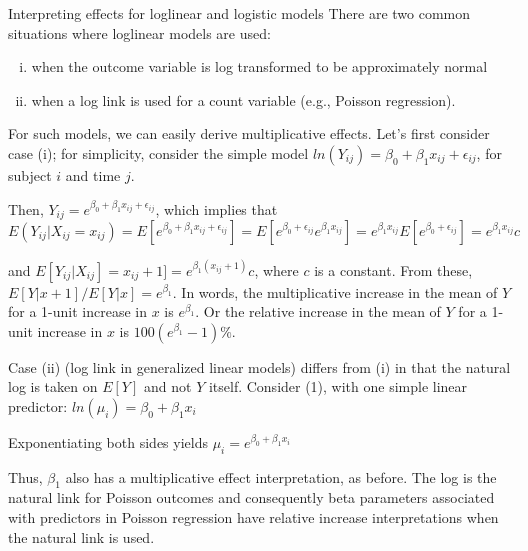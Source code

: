\documentclass[
  9pt,
  ignorenonframetext,
]{beamer}
\providecommand{\tightlist}{%
  \setlength{\itemsep}{0pt}\setlength{\parskip}{0pt}}
\begin{document}
\begin{frame}{Interpreting effects for loglinear and logistic models}
\protect\hypertarget{interpreting-effects-for-loglinear-and-logistic-models}{}
There are two common situations where loglinear models are used:

\begin{enumerate}
[(i)]
\tightlist
\item
  when the outcome variable is log transformed to be approximately
  normal
\item
  when a log link is used for a count variable (e.g., Poisson
  regression).
\end{enumerate}

For such models, we can easily derive multiplicative effects. Let's
first consider case (i); for simplicity, consider the simple model
\(ln(Y_{ij})= \beta_0+ \beta_1 x_{ij} + \epsilon_{ij}\), for subject
\(i\) and time \(j\).

Then, \(Y_{ij} = e^{\beta_0+ \beta_1 x_{ij} + \epsilon_{ij}}\), which
implies that
\(E(Y_{ij} |X_{ij} =x_{ij} )= E[e^{\beta_0+ \beta_1 x_{ij} + \epsilon_{ij}}] =E[e^{\beta_0+ \epsilon_{ij} } e^{\beta_1 x_{ij}}] =e^{\beta_1 x_{ij} } E[e^{\beta_0+ \epsilon_{ij}}] =e^{ \beta_1 x_{ij} } c\)

and \(E[Y_{ij}| X_{ij}] = x_{ij} +1]=e^{\beta_1 (x_{ij} +1)} c\), where
\(c\) is a constant. From these, \(E[Y|x+1]/E[Y|x]=e^{\beta_1 }\). In
words, the multiplicative increase in the mean of \(Y\) for a 1-unit
increase in \(x\) is \(e^{\beta_1 }\). Or the relative increase in the
mean of \(Y\) for a 1-unit increase in \(x\) is
\(100(e^{\beta_1 }-1)\%\).
\end{frame}

\begin{frame}{}
\protect\hypertarget{section-1}{}
Case (ii) (log link in generalized linear models) differs from (i) in
that the natural log is taken on \(E[Y]\) and not \(Y\) itself. Consider
(1), with one simple linear predictor:
\(ln(\mu_i)= \beta_0+ \beta_1 x_i\)

Exponentiating both sides yields \(\mu_i=e^{\beta_0+ \beta_1 x_i }\)

Thus, \(\beta_1\) also has a multiplicative effect interpretation, as
before. The log is the natural link for Poisson outcomes and
consequently beta parameters associated with predictors in Poisson
regression have relative increase interpretations when the natural link
is used.
\end{frame}
\end{document}

